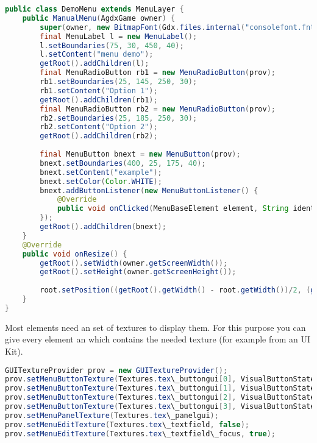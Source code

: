 \doinline
\begin{lstlisting}[caption=Markdown Tutorial: fenced code block, title=\hspace{0 pt}, language=java]
public class DemoMenu extends MenuLayer {
	public ManualMenu(AgdxGame owner) {
		super(owner, new BitmapFont(Gdx.files.internal("consolefont.fnt")));
		final MenuLabel l = new MenuLabel();
		l.setBoundaries(75, 30, 450, 40);
		l.setContent("menu demo");
		getRoot().addChildren(l);
		final MenuRadioButton rb1 = new MenuRadioButton(prov);
		rb1.setBoundaries(25, 145, 250, 30);
		rb1.setContent("Option 1");
		getRoot().addChildren(rb1);
		final MenuRadioButton rb2 = new MenuRadioButton(prov);
		rb2.setBoundaries(25, 185, 250, 30);
		rb2.setContent("Option 2");
		getRoot().addChildren(rb2);
		
		final MenuButton bnext = new MenuButton(prov);
		bnext.setBoundaries(400, 25, 175, 40);
		bnext.setContent("example");
		bnext.setColor(Color.WHITE);
		bnext.addButtonListener(new MenuButtonListener() {
			@Override
			public void onClicked(MenuBaseElement element, String identifier) { System.out.println("TRIGGERED"); }
		});
		getRoot().addChildren(bnext);
	}
	@Override
	public void onResize() {
		getRoot().setWidth(owner.getScreenWidth());
		getRoot().setHeight(owner.getScreenHeight());
		
		root.setPosition((getRoot().getWidth() - root.getWidth())/2, (getRoot().getHeight() - root.getHeight())/2);
	}
}
\end{lstlisting}

Most elements need an set of textures to display them. For this purpose you can give every element an  which contains the needed texture (for example from an UI Kit).

\doinline
\begin{lstlisting}[caption=Markdown Tutorial: fenced code block, title=\hspace{0 pt}, language=java]
GUITextureProvider prov = new GUITextureProvider();
prov.setMenuButtonTexture(Textures.tex\_buttongui[0], VisualButtonState.NORMAL);
prov.setMenuButtonTexture(Textures.tex\_buttongui[1], VisualButtonState.HOVERED);
prov.setMenuButtonTexture(Textures.tex\_buttongui[2], VisualButtonState.PRESSED);
prov.setMenuButtonTexture(Textures.tex\_buttongui[3], VisualButtonState.DISABLED);
prov.setMenuPanelTexture(Textures.tex\_panelgui);
prov.setMenuEditTexture(Textures.tex\_textfield, false);
prov.setMenuEditTexture(Textures.tex\_textfield\_focus, true);
\end{lstlisting}


